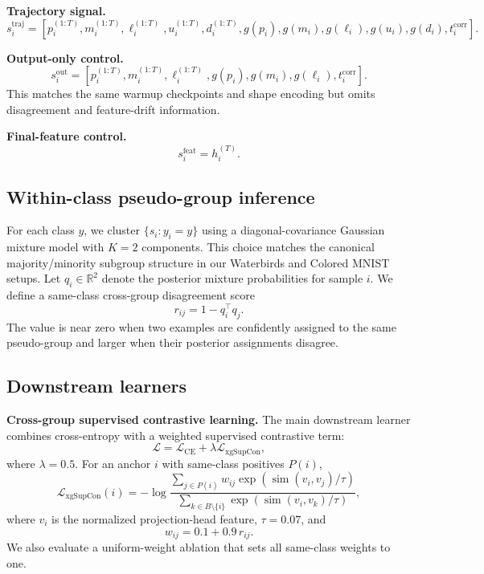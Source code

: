 \documentclass{article}
\newcommand{\R}{\mathbb{R}}
\begin{document}
\textbf{Trajectory signal.}
\begin{equation}
  s_i^{\mathrm{traj}} = [p_i^{(1:T)}, m_i^{(1:T)}, \ell_i^{(1:T)}, u_i^{(1:T)}, d_i^{(1:T)}, g(p_i), g(m_i), g(\ell_i), g(u_i), g(d_i), t_i^{\mathrm{corr}}].
\end{equation}

\textbf{Output-only control.}
\begin{equation}
  s_i^{\mathrm{out}} = [p_i^{(1:T)}, m_i^{(1:T)}, \ell_i^{(1:T)}, g(p_i), g(m_i), g(\ell_i), t_i^{\mathrm{corr}}].
\end{equation}
This matches the same warmup checkpoints and shape encoding but omits disagreement and feature-drift information.

\textbf{Final-feature control.}
\begin{equation}
  s_i^{\mathrm{feat}} = h_i^{(T)}.
\end{equation}

\subsection{Within-class pseudo-group inference}
For each class $y$, we cluster $\{s_i : y_i = y\}$ using a diagonal-covariance Gaussian mixture model with $K=2$ components. This choice matches the canonical majority/minority subgroup structure in our Waterbirds and Colored MNIST setups. Let $q_i \in \R^2$ denote the posterior mixture probabilities for sample $i$. We define a same-class cross-group disagreement score
\begin{equation}
  r_{ij} = 1 - q_i^\top q_j.
\end{equation}
The value is near zero when two examples are confidently assigned to the same pseudo-group and larger when their posterior assignments disagree.

\subsection{Downstream learners}
\textbf{Cross-group supervised contrastive learning.}
The main downstream learner combines cross-entropy with a weighted supervised contrastive term:
\begin{equation}
  \mathcal{L} = \mathcal{L}_{\mathrm{CE}} + \lambda \mathcal{L}_{\mathrm{xgSupCon}},
\end{equation}
where $\lambda = 0.5$. For an anchor $i$ with same-class positives $P(i)$,
\begin{equation}
  \mathcal{L}_{\mathrm{xgSupCon}}(i) =
  -\log
  \frac{\sum_{j \in P(i)} w_{ij} \exp(\operatorname{sim}(v_i, v_j) / \tau)}
       {\sum_{k \in B \setminus \{i\}} \exp(\operatorname{sim}(v_i, v_k) / \tau)},
\end{equation}
where $v_i$ is the normalized projection-head feature, $\tau = 0.07$, and
\begin{equation}
  w_{ij} = 0.1 + 0.9\, r_{ij}.
\end{equation}
We also evaluate a uniform-weight ablation that sets all same-class weights to one.
\end{document}
